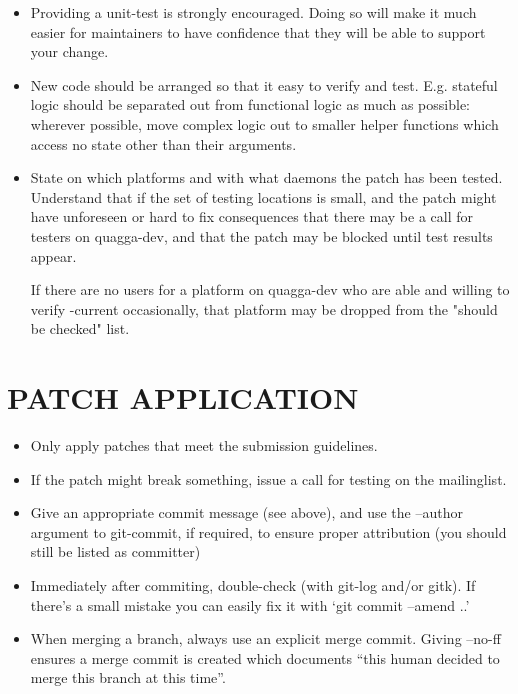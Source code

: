 \documentclass[oneside]{article}
\begin{document}
\begin{itemize}
\item Providing a unit-test is strongly encouraged. Doing so will make it
      much easier for maintainers to have confidence that they will be able
      to support your change.

\item New code should be arranged so that it easy to verify and test. E.g. 
      stateful logic should be separated out from functional logic as much as
      possible: wherever possible, move complex logic out to smaller helper
      functions which access no state other than their arguments.

\item State on which platforms and with what daemons the patch has been
      tested.  Understand that if the set of testing locations is small,
      and the patch might have unforeseen or hard to fix consequences that
      there may be a call for testers on quagga-dev, and that the patch
      may be blocked until test results appear.

      If there are no users for a platform on quagga-dev who are able and
      willing to verify -current occasionally, that platform may be
      dropped from the "should be checked" list.

\end{itemize}

\section{PATCH APPLICATION}

\begin{itemize}

\item Only apply patches that meet the submission guidelines.

\item If the patch might break something, issue a call for testing on the
      mailinglist.

\item Give an appropriate commit message (see above), and use the --author
      argument to git-commit, if required, to ensure proper attribution (you
      should still be listed as committer)

\item Immediately after commiting, double-check (with git-log and/or gitk).
      If there's a small mistake you can easily fix it with `git commit
      --amend ..'

\item When merging a branch, always use an explicit merge commit. Giving
      --no-ff ensures a merge commit is created which documents ``this human
      decided to merge this branch at this time''.
\end{itemize}
\end{document}
